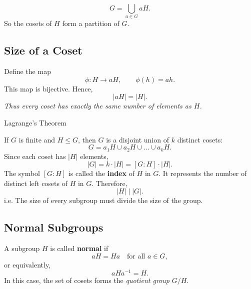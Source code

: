 \documentclass[a4paper,12pt]{article}
\theoremstyle{definition}
\begin{document}
\begin{equation*}
G = \bigcup_{a \in G} aH.
\end{equation*}
So the cosets of $H$ form a partition of $G$.

\subsection{Size of a Coset}

Define the map
\begin{equation*}
\phi : H \to aH, \qquad \phi(h) = ah.
\end{equation*}
This map is bijective. Hence,
\begin{equation*}
|aH| = |H|.
\end{equation*}
\emph{Thus every coset has exactly the same number of elements as $H$.}

\begin{stkynote}[green]{Lagrange's Theorem}

    If $G$ is finite and $H \leq G$, then $G$ is a disjoint union of $k$ distinct cosets:
    \begin{equation*}
    G = a_1H \cup a_2H \cup \dots \cup a_kH.
    \end{equation*}
    Since each coset has $|H|$ elements,
    \begin{equation*}
    |G| = k \cdot |H| = [G : H] \cdot |H|.
    \end{equation*}
    The symbol $[G:H]$ is called the \textbf{index} of $H$ in $G$. It represents the number of distinct left cosets of $H$ in $G$. Therefore,
    \begin{equation*}
    |H| \mid |G|.
    \end{equation*}
    i.e. The size of every subgroup must divide the size of the group.
\end{stkynote}


\subsection{Normal Subgroups}

A subgroup $H$ is called \textbf{normal} if
\begin{equation*}
aH = Ha \quad \text{for all } a \in G,
\end{equation*}
or equivalently,
\begin{equation*}
aHa^{-1} = H.
\end{equation*}
In this case, the set of cosets forms the \emph{quotient group} $G/H$.
\end{document}
